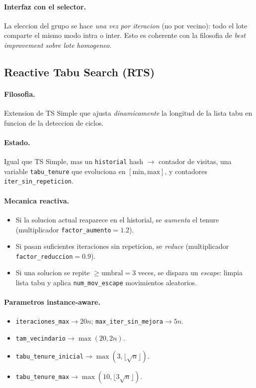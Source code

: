 \documentclass[11pt,a4paper]{article}
\newcommand{\code}[1]{\texttt{#1}}
\begin{document}
\paragraph{Interfaz con el selector.} La eleccion del grupo se hace
\emph{una vez por iteracion} (no por vecino): todo el lote comparte el
mismo modo intra o inter. Esto es coherente con la filosofia de
\emph{best improvement sobre lote homogeneo}.

\subsection{Reactive Tabu Search (RTS)}\label{sec:rts}

\paragraph{Filosofia.} Extension de TS Simple que ajusta
\emph{dinamicamente} la longitud de la lista tabu en funcion de la
deteccion de ciclos.

\paragraph{Estado.} Igual que TS Simple, mas un \code{historial}
hash $\to$ contador de visitas, una variable \code{tabu\_tenure}
que evoluciona en $[\text{min}, \text{max}]$, y contadores
\code{iter\_sin\_repeticion}.

\paragraph{Mecanica reactiva.}
\begin{itemize}
\item Si la solucion actual reaparece en el historial, se \emph{aumenta}
el tenure (multiplicador \code{factor\_aumento}$=1.2$).
\item Si pasan suficientes iteraciones sin repeticion, se \emph{reduce}
(multiplicador \code{factor\_reduccion}$=0.9$).
\item Si una solucion se repite $\ge \text{umbral}=3$ veces, se dispara
un \emph{escape}: limpia lista tabu y aplica
\code{num\_mov\_escape} movimientos aleatorios.
\end{itemize}

\paragraph{Parametros instance-aware.}
\begin{itemize}
\item \code{iteraciones\_max}$\to 20n$; \code{max\_iter\_sin\_mejora}$\to 5n$.
\item \code{tam\_vecindario}$\to \max(20, 2n)$.
\item \code{tabu\_tenure\_inicial}$\to \max(3, \lfloor\sqrt{n}\rfloor)$.
\item \code{tabu\_tenure\_max}$\to \max(10, \lfloor 3\sqrt{n}\rfloor)$.
\end{itemize}
\end{document}
